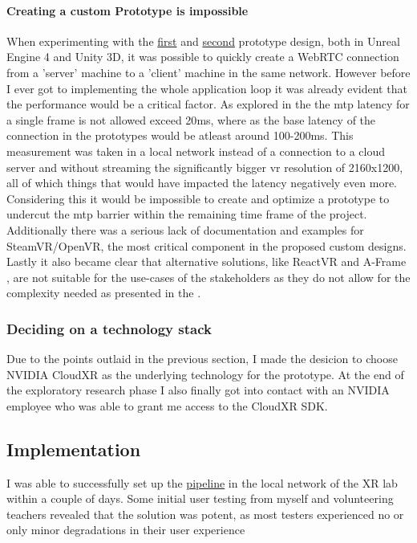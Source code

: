 \paragraph{Creating a custom Prototype is impossible}
When experimenting with the \hyperref[fig:pr11]{first} and \hyperref[fig:pr12]{second} prototype design, both in Unreal Engine 4 and Unity 3D, it was possible to quickly create a WebRTC connection from a 'server' machine to a 'client' machine in the same network. However before I ever got to implementing the whole application loop it was already evident that the performance would be a critical factor. As explored in the  the \acrfull{mtp} latency for a single frame is not allowed exceed 20\acrshort{ms}, where as the base latency of the connection in the prototypes would be atleast around 100-200\acrshort{ms}. This measurement was taken in a local network instead of a connection to a cloud server and without streaming the significantly bigger \acrshort{vr} resolution of 2160x1200, all of which things that would have impacted the latency negatively even more. Considering this it would be impossible to create and optimize a prototype to undercut the \acrshort{mtp} barrier within the remaining time frame of the project. Additionally there was a serious lack of documentation and examples for SteamVR/OpenVR, the most critical component in the proposed custom designs. Lastly it also became clear that alternative solutions, like ReactVR \parencite{reactVR} and A-Frame \parencite{aframe}, are not suitable for the use-cases of the stakeholders as they do not allow for the complexity needed as presented in the .

\subsubsection{Deciding on a technology stack}
Due to the points outlaid in the previous section, I made the desicion to choose NVIDIA CloudXR as the underlying technology for the prototype. At the end of the exploratory research phase I also finally got into contact with an NVIDIA employee who was able to grant me access to the CloudXR SDK.

\subsection{Implementation}
I was able to successfully set up the \hyperref[fig:pr0]{pipeline} in the local network of the XR lab within a couple of days. Some initial user testing from myself and volunteering teachers revealed that the solution was potent, as most testers experienced no or only minor degradations in their user experience

